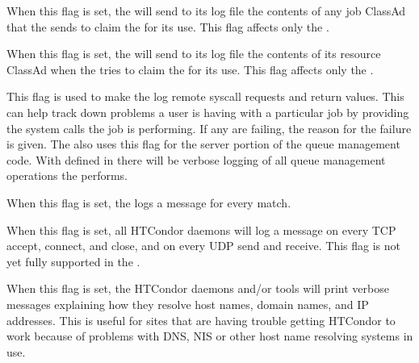 \begin{description}
\begin{description}
  \label{dflag:job}
  \item[\Dflag{JOB}]
    When this flag is set, the
     will send to its log file the contents of any
    job ClassAd that the  sends to claim the
     for its use.  This flag affects only the
    .
    
  \label{dflag:machine}
  \item[\Dflag{MACHINE}]
    When this flag is set,
    the  will send to its log file the contents of
    its resource ClassAd when the  tries to claim the
     for its use.  This flag affects only the
    .

  \label{dflag:syscalls}
  \item[\Dflag{SYSCALLS}]
    This flag is used to
    make the  log remote syscall requests and return
    values.  This can help track down problems a user is having with a
    particular job by providing the system calls the job is
    performing. If any are failing, the reason for the
    failure is given.  The  also uses this flag for the server
    portion of the queue management code.  With 
    defined in  there will be verbose logging of all
    queue management operations the  performs.  

  \label{dflag:match}
  \item[\Dflag{MATCH}]
    When this flag is
    set, the  logs a message for every match.

  \label{dflag:network}
  \item[\Dflag{NETWORK}]
    When this flag is set,
    all HTCondor daemons will log a message on every TCP accept, connect,
    and close, and on every UDP send and receive.  This flag is not
    yet fully supported in the .

  \label{dflag:hostname}
  \item[\Dflag{HOSTNAME}]
    When this flag is set, the HTCondor daemons and/or tools will print
    verbose messages explaining how they resolve host names, domain
    names, and IP addresses.
    This is useful for sites that are having trouble getting HTCondor to
    work because of problems with DNS, NIS or other host name resolving
    systems in use.


\end{description}
\end{description}
